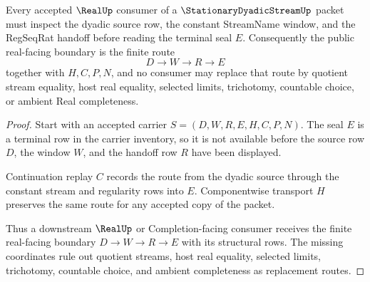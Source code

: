 \begin{theorem}
\label{thm:stationary-dyadic-stream-real-seal-boundary}
Every accepted $\RealUp$ consumer of a $\StationaryDyadicStreamUp$ packet must inspect the dyadic source row, the constant StreamName window, and the RegSeqRat handoff before reading the terminal seal $E$. Consequently the public real-facing boundary is the finite route
$$
D \longrightarrow W \longrightarrow R \longrightarrow E
$$
together with $H,C,P,N$, and no consumer may replace that route by quotient stream equality, host real equality, selected limits, trichotomy, countable choice, or ambient Real completeness.
\end{theorem}
\begin{proof}
Start with an accepted carrier $S=(D,W,R,E,H,C,P,N)$. The seal $E$ is a terminal row in the carrier inventory, so it is not available before the source row $D$, the window $W$, and the handoff row $R$ have been displayed.

Continuation replay $C$ records the route from the dyadic source through the constant stream and regularity rows into $E$. Componentwise transport $H$ preserves the same route for any accepted copy of the packet.

Thus a downstream $\RealUp$ or Completion-facing consumer receives the finite real-facing boundary $D \to W \to R \to E$ with its structural rows. The missing coordinates rule out quotient streams, host real equality, selected limits, trichotomy, countable choice, and ambient completeness as replacement routes.
\end{proof}


\begin{closurestatus}{\StationaryDyadicStreamUp}
  \theoryclosure{\seedClosure}
  \formalstatus{\encodedDefV}
\end{closurestatus}
